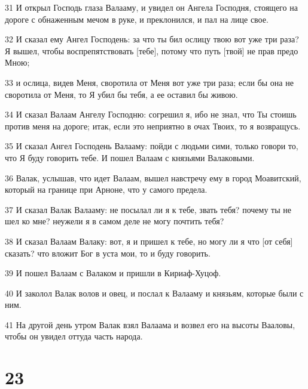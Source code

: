 \par 31 И открыл Господь глаза Валааму, и увидел он Ангела Господня, стоящего на дороге с обнаженным мечом в руке, и преклонился, и пал на лице свое.
\par 32 И сказал ему Ангел Господень: за что ты бил ослицу твою вот уже три раза? Я вышел, чтобы воспрепятствовать [тебе], потому что путь [твой] не прав предо Мною;
\par 33 и ослица, видев Меня, своротила от Меня вот уже три раза; если бы она не своротила от Меня, то Я убил бы тебя, а ее оставил бы живою.
\par 34 И сказал Валаам Ангелу Господню: согрешил я, ибо не знал, что Ты стоишь против меня на дороге; итак, если это неприятно в очах Твоих, то я возвращусь.
\par 35 И сказал Ангел Господень Валааму: пойди с людьми сими, только говори то, что Я буду говорить тебе. И пошел Валаам с князьями Валаковыми.
\par 36 Валак, услышав, что идет Валаам, вышел навстречу ему в город Моавитский, который на границе при Арноне, что у самого предела.
\par 37 И сказал Валак Валааму: не посылал ли я к тебе, звать тебя? почему ты не шел ко мне? неужели я в самом деле не могу почтить тебя?
\par 38 И сказал Валаам Валаку: вот, я и пришел к тебе, но могу ли я что [от себя] сказать? что вложит Бог в уста мои, то и буду говорить.
\par 39 И пошел Валаам с Валаком и пришли в Кириаф-Хуцоф.
\par 40 И заколол Валак волов и овец, и послал к Валааму и князьям, которые были с ним.
\par 41 На другой день утром Валак взял Валаама и возвел его на высоты Вааловы, чтобы он увидел оттуда часть народа.

\chapter{23}


